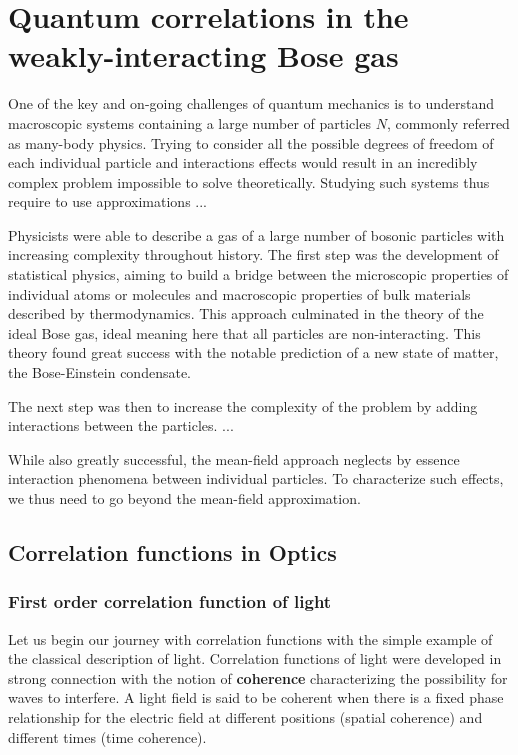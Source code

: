\chapter{Quantum correlations in the weakly-interacting Bose gas}


One of the key and on-going challenges of quantum mechanics is to understand macroscopic systems containing a large number of particles $N$, commonly referred as many-body physics. Trying to consider all the possible degrees of freedom of each individual particle and interactions effects would result in an incredibly complex problem impossible to solve theoretically. Studying such systems thus require to use approximations ...

Physicists were able to describe a gas of a large number of bosonic particles with increasing complexity throughout history. The first step was the development of statistical physics, aiming to build a bridge between the microscopic properties of individual atoms or molecules and macroscopic properties of bulk materials described by thermodynamics. This approach culminated in the theory of the ideal Bose gas, ideal meaning here that all particles are non-interacting. This theory found great success with the notable prediction of a new state of matter, the Bose-Einstein condensate. 

The next step was then to increase the complexity of the problem by adding interactions between the particles. ...

While also greatly successful, the mean-field approach neglects by essence interaction phenomena between individual particles. To characterize such effects, we thus need to go beyond the mean-field approximation. 




\section{Correlation functions in Optics}

\subsection{First order correlation function of light}

Let us begin our journey with correlation functions with the simple example of the classical description of light. Correlation functions of light were developed in strong connection with the notion of \textbf{coherence} characterizing the possibility for waves to interfere. A light field is said to be coherent when there is a fixed phase relationship for the electric field at different positions (spatial coherence) and different times (time coherence). 


